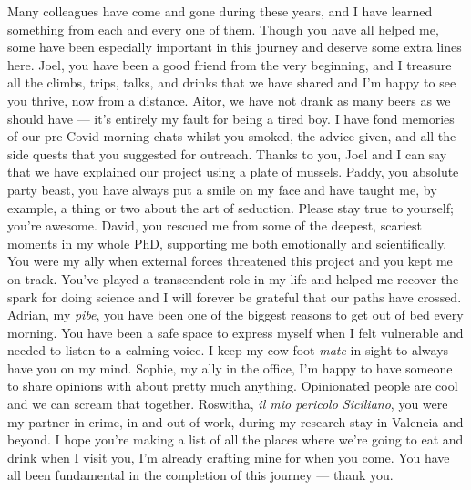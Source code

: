 Many colleagues have come and gone during these years, and I have learned something from each and every one of them. Though you have all helped me, some have been especially important in this journey and deserve some extra lines here. Joel, you have been a good friend from the very beginning, and I treasure all the climbs, trips, talks, and drinks that we have shared and I'm happy to see you thrive, now from a distance. Aitor, we have not drank as many beers as we should have --- it's entirely my fault for being a tired boy. I have fond memories of our pre-Covid morning chats whilst you smoked, the advice given, and all the side quests that you suggested for outreach. Thanks to you, Joel and I can say that we have explained our project using a plate of mussels. Paddy, you absolute party beast, you have always put a smile on my face and have taught me, by example, a thing or two about the art of seduction. Please stay true to yourself; you're awesome. David, you rescued me from some of the deepest, scariest moments in my whole PhD, supporting me both emotionally and scientifically. You were my ally when external forces threatened this project and you kept me on track. You've played a transcendent role in my life and helped me recover the spark for doing science and I will forever be grateful that our paths have crossed. Adrian, my \textit{pibe}, you have been one of the biggest reasons to get out of bed every morning. You have been a safe space to express myself when I felt vulnerable and needed to listen to a calming voice. I keep my cow foot \textit{mate} in sight to always have you on my mind. Sophie, my ally in the office, I'm happy to have someone to share opinions with about pretty much anything. Opinionated people are cool and we can scream that together. Roswitha, \textit{il mio pericolo Siciliano}, you were my partner in crime, in and out of work, during my research stay in Valencia and beyond. I hope you're making a list of all the places where we're going to eat and drink when I visit you, I'm already crafting mine for when you come. You have all been fundamental in the completion of this journey --- thank you.

